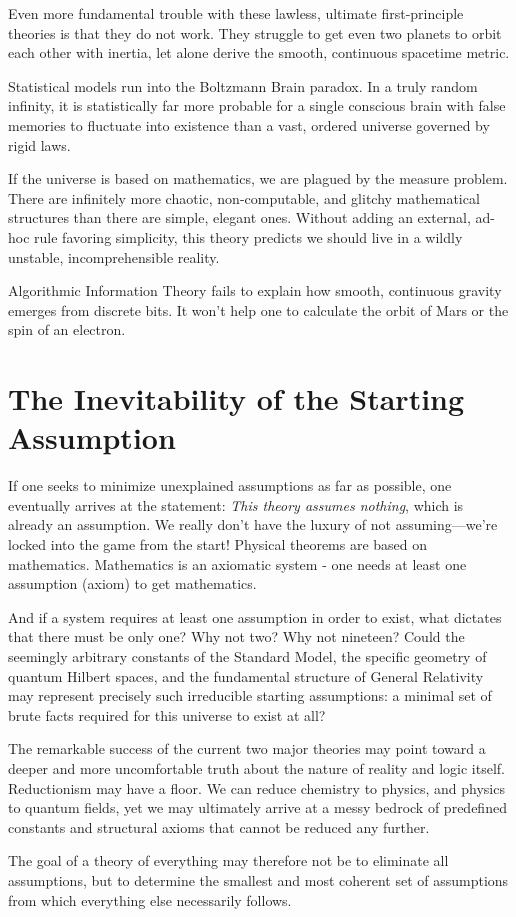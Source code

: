 Even more fundamental trouble with these lawless, ultimate first-principle theories is that they do not work.
They struggle to get even two planets to orbit each other with inertia, let alone derive the smooth, continuous spacetime metric.

Statistical models run into the Boltzmann Brain paradox. In a truly random infinity, it is statistically far more probable for a 
single conscious brain with false memories to fluctuate into existence than a vast, ordered universe governed by rigid laws. 

If the universe is based on mathematics, we are plagued by the measure problem.
There are infinitely more chaotic, non-computable, and glitchy mathematical structures than there are simple, elegant ones.
Without adding an external, ad-hoc rule favoring simplicity, this theory predicts we should live in a wildly unstable, incomprehensible reality.

Algorithmic Information Theory fails to explain how smooth, continuous gravity emerges from discrete bits.
It won't help one to calculate the orbit of Mars or the spin of an electron.


\section{The Inevitability of the Starting Assumption}

If one seeks to minimize unexplained assumptions as far as possible, one eventually arrives at the statement:
\textit{This theory assumes nothing}, which is already an assumption. We really don't have the luxury of not assuming—we're locked into the game from the start!
Physical theorems are based on mathematics. Mathematics is an axiomatic system - one needs at least one assumption (axiom) to get mathematics. 

And if a system requires at least one assumption in order to exist, what dictates that there must be only one? Why not two? Why not nineteen?
Could the seemingly arbitrary constants of the Standard Model, the specific geometry of quantum Hilbert spaces, and the fundamental structure of General Relativity
may represent precisely such irreducible starting assumptions: a minimal set of brute facts required for this universe to exist at all?

The remarkable success of the current two major theories may point toward a deeper and more uncomfortable truth about the nature of reality and logic itself.
Reductionism may have a floor. We can reduce chemistry to physics, and physics to quantum fields,
yet we may ultimately arrive at a messy bedrock of predefined constants and structural axioms that cannot be reduced any further.

The goal of a theory of everything may therefore not be to eliminate all assumptions,
but to determine the smallest and most coherent set of assumptions from which everything else necessarily follows.

